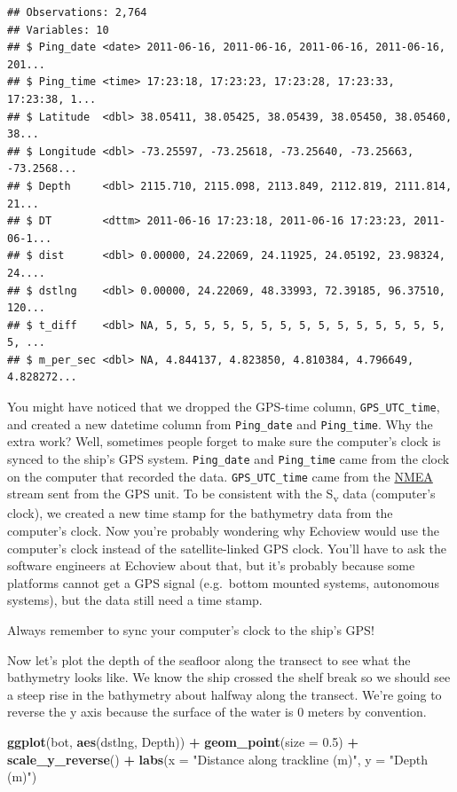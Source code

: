 \documentclass[]{article}
\newenvironment{Shaded}{\begin{snugshade}}{\end{snugshade}}
\newcommand{\DataTypeTok}[1]{\textcolor[rgb]{0.13,0.29,0.53}{#1}}
\newcommand{\FloatTok}[1]{\textcolor[rgb]{0.00,0.00,0.81}{#1}}
\newcommand{\KeywordTok}[1]{\textcolor[rgb]{0.13,0.29,0.53}{\textbf{#1}}}
\newcommand{\NormalTok}[1]{#1}
\newcommand{\OperatorTok}[1]{\textcolor[rgb]{0.81,0.36,0.00}{\textbf{#1}}}
\newcommand{\StringTok}[1]{\textcolor[rgb]{0.31,0.60,0.02}{#1}}
\begin{document}
\begin{verbatim}
## Observations: 2,764
## Variables: 10
## $ Ping_date <date> 2011-06-16, 2011-06-16, 2011-06-16, 2011-06-16, 201...
## $ Ping_time <time> 17:23:18, 17:23:23, 17:23:28, 17:23:33, 17:23:38, 1...
## $ Latitude  <dbl> 38.05411, 38.05425, 38.05439, 38.05450, 38.05460, 38...
## $ Longitude <dbl> -73.25597, -73.25618, -73.25640, -73.25663, -73.2568...
## $ Depth     <dbl> 2115.710, 2115.098, 2113.849, 2112.819, 2111.814, 21...
## $ DT        <dttm> 2011-06-16 17:23:18, 2011-06-16 17:23:23, 2011-06-1...
## $ dist      <dbl> 0.00000, 24.22069, 24.11925, 24.05192, 23.98324, 24....
## $ dstlng    <dbl> 0.00000, 24.22069, 48.33993, 72.39185, 96.37510, 120...
## $ t_diff    <dbl> NA, 5, 5, 5, 5, 5, 5, 5, 5, 5, 5, 5, 5, 5, 5, 5, 5, ...
## $ m_per_sec <dbl> NA, 4.844137, 4.823850, 4.810384, 4.796649, 4.828272...
\end{verbatim}

You might have noticed that we dropped the GPS-time column,
\texttt{GPS\_UTC\_time}, and created a new datetime column from
\texttt{Ping\_date} and \texttt{Ping\_time}. Why the extra work? Well,
sometimes people forget to make sure the computer's clock is synced to
the ship's GPS system. \texttt{Ping\_date} and \texttt{Ping\_time} came
from the clock on the computer that recorded the data.
\texttt{GPS\_UTC\_time} came from the
\href{https://en.wikipedia.org/wiki/NMEA_2000_}{NMEA} stream sent from
the GPS unit. To be consistent with the S\textsubscript{v} data
(computer's clock), we created a new time stamp for the bathymetry data
from the computer's clock. Now you're probably wondering why Echoview
would use the computer's clock instead of the satellite-linked GPS
clock. You'll have to ask the software engineers at Echoview about that,
but it's probably because some platforms cannot get a GPS signal
(e.g.~bottom mounted systems, autonomous systems), but the data still
need a time stamp.

Always remember to sync your computer's clock to the ship's GPS!

Now let's plot the depth of the seafloor along the transect to see what
the bathymetry looks like. We know the ship crossed the shelf break so
we should see a steep rise in the bathymetry about halfway along the
transect. We're going to reverse the y axis because the surface of the
water is 0 meters by convention.

\begin{Shaded}
\begin{Highlighting}[]
\KeywordTok{ggplot}\NormalTok{(bot, }\KeywordTok{aes}\NormalTok{(dstlng, Depth)) }\OperatorTok{+}
\StringTok{  }\KeywordTok{geom_point}\NormalTok{(}\DataTypeTok{size =} \FloatTok{0.5}\NormalTok{) }\OperatorTok{+}
\StringTok{  }\KeywordTok{scale_y_reverse}\NormalTok{() }\OperatorTok{+}
\StringTok{  }\KeywordTok{labs}\NormalTok{(}\DataTypeTok{x =} \StringTok{"Distance along trackline (m)"}\NormalTok{, }\DataTypeTok{y =} \StringTok{"Depth (m)"}\NormalTok{)}
\end{Highlighting}
\end{Shaded}
\end{document}
